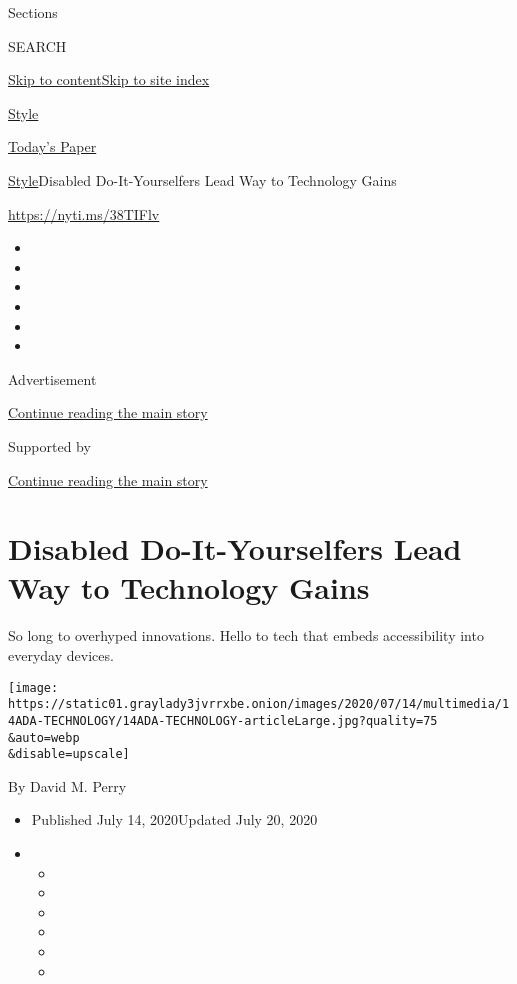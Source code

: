 Sections

SEARCH

\protect\hyperlink{site-content}{Skip to
content}\protect\hyperlink{site-index}{Skip to site index}

\href{https://www.nytimes3xbfgragh.onion/section/style}{Style}

\href{https://myaccount.nytimes3xbfgragh.onion/auth/login?response_type=cookie\&client_id=vi}{}

\href{https://www.nytimes3xbfgragh.onion/section/todayspaper}{Today's
Paper}

\href{/section/style}{Style}\textbar{}Disabled Do-It-Yourselfers Lead
Way to Technology Gains

\href{https://nyti.ms/38TIFlv}{https://nyti.ms/38TIFlv}

\begin{itemize}
\item
\item
\item
\item
\item
\item
\end{itemize}

Advertisement

\protect\hyperlink{after-top}{Continue reading the main story}

Supported by

\protect\hyperlink{after-sponsor}{Continue reading the main story}

\hypertarget{disabled-do-it-yourselfers-lead-way-to-technology-gains}{%
\section{Disabled Do-It-Yourselfers Lead Way to Technology
Gains}\label{disabled-do-it-yourselfers-lead-way-to-technology-gains}}

So long to overhyped innovations. Hello to tech that embeds
accessibility into everyday devices.

\texttt{[image: https://static01.graylady3jvrrxbe.onion/images/2020/07/14/multimedia/14ADA-TECHNOLOGY/14ADA-TECHNOLOGY-articleLarge.jpg?quality=75\\\&auto=webp\\\&disable=upscale]}

By David M. Perry

\begin{itemize}
\item
  Published July 14, 2020Updated July 20, 2020
\item
  \begin{itemize}
  \item
  \item
  \item
  \item
  \item
  \item
  \end{itemize}
\end{itemize}

